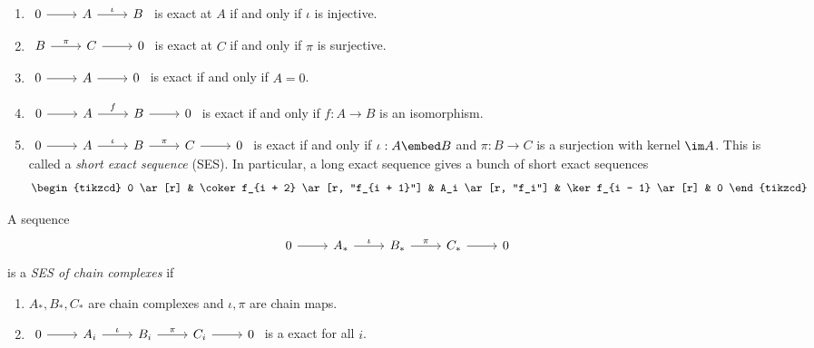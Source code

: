 \documentclass[a4paper]{article}
\begin{document}
\begin{eg}\leavevmode
  \begin{enumerate}
  \item \(
    \begin{tikzcd}
      0 \ar[r] & A \ar[r, "\iota"] & B 
    \end{tikzcd}
  \) is exact at \(A\) if and only if \(\iota\) is injective.

\item \(
    \begin{tikzcd}
      B \ar[r, "\pi"] & C \ar[r] & 0
    \end{tikzcd}
  \) is exact at \(C\) if and only if \(\pi\) is surjective.
\item \(
  \begin{tikzcd}
    0 \ar[r] & A \ar[r] & 0
  \end{tikzcd}
  \) is exact if and only if \(A = 0\).
\item \(
  \begin{tikzcd}
    0 \ar[r] & A \ar[r, "f"] & B \ar[r] & 0
  \end{tikzcd}
  \) is exact if and only if \(f: A \to B\) is an isomorphism.
\item \(
  \begin{tikzcd}
    0 \ar[r] & A \ar[r, "\iota"] & B \ar[r, "\pi"] & C \ar[r] & 0
  \end{tikzcd}
  \) is exact if and only if \(\iota: A \embed B \) and \(\pi: B \to C\) is a surjection with kernel \(\im A\). This is called a \emph{short exact sequence} (SES). In particular, a long exact sequence gives a bunch of short exact sequences
  \[
    \begin{tikzcd}
      0 \ar[r] & \coker f_{i + 2} \ar[r, "f_{i + 1}"] & A_i \ar[r, "f_i"] & \ker f_{i - 1} \ar[r] & 0
    \end{tikzcd}
  \]
  \end{enumerate}
\end{eg}

\begin{definition}
  A sequence
  \[
    \begin{tikzcd}
      0 \ar[r] & A_* \ar[r, "\iota"] & B_* \ar[r, "\pi"] & C_* \ar[r] & 0
    \end{tikzcd}
  \]
  is a \emph{SES of chain complexes} if
  \begin{enumerate}
  \item \(A_*, B_*, C_*\) are chain complexes and \(\iota, \pi\) are chain maps.
  \item \(
    \begin{tikzcd}
      0 \ar[r] & A_i \ar[r, "\iota"] & B_i \ar[r, "\pi"] & C_i \ar[r] & 0
    \end{tikzcd}
    \) is a exact for all \(i\).
  \end{enumerate}
\end{definition}
\end{document}
